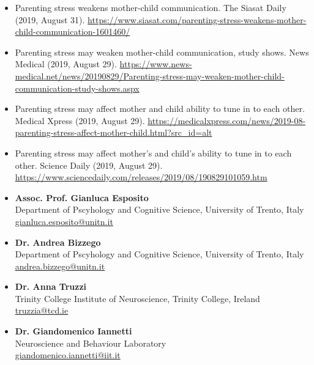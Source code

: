 \documentclass[10pt,a4paper]{altacv}
\begin{document}
\begin{fullwidth}
\begin{itemize}
			\item Parenting stress weakens mother-child communication. The Siasat Daily (2019, August 31). \url{https://www.siasat.com/parenting-stress-weakens-mother-child-communication-1601460/}
			\item Parenting stress may weaken mother-child communication, study shows. News Medical (2019, August 29). \url{https://www.news-medical.net/news/20190829/Parenting-stress-may-weaken-mother-child-communication-study-shows.aspx}
			\item Parenting stress may affect mother and child ability to tune in to each other. Medical Xpress (2019, August 29). \url{https://medicalxpress.com/news/2019-08-parenting-stress-affect-mother-child.html?src_id=alt}
			\item Parenting stress may affect mother's and child's ability to tune in to each other. Science Daily (2019, August 29). \url{https://www.sciencedaily.com/releases/2019/08/190829101059.htm}	
			
		\end{itemize}
		

		
		\newpage
		
		
		\begin{itemize}
			\item \textbf{Assoc. Prof. Gianluca Esposito}\\
			Department of Pscyhology and Cognitive Science, University of Trento, Italy\\
			\href{mailto:gianluca.esposito@unitn.it}{gianluca.esposito@unitn.it}

			\item \textbf{Dr. Andrea Bizzego}\\
			Department of Pscyhology and Cognitive Science, University of Trento, Italy\\
			\href{mailto:andrea.bizzego@unitn.it}{andrea.bizzego@unitn.it}
			
			\item \textbf{Dr. Anna Truzzi}\\
			Trinity College Institute of Neuroscience, Trinity College, Ireland\\
			\href{mailto:truzzia@tcd.ie}{truzzia@tcd.ie}
			
			
			\item \textbf{Dr. Giandomenico Iannetti}\\
			Neuroscience and Behaviour Laboratory\\
			\href{mailto:giandomenico.iannetti@iit.it}{giandomenico.iannetti@iit.it}

		\end{itemize}
		
	\end{fullwidth}
	
\end{document}

